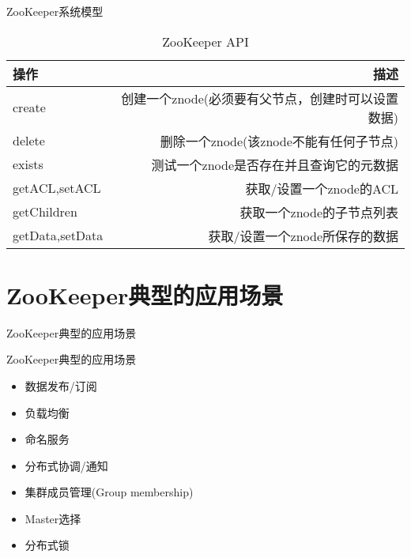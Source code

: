 \documentclass[10pt]{beamer}
\begin{document}
\begin{frame}[fragile]{ZooKeeper系统模型}

  \begin{table}
    \caption{ZooKeeper API}\center
    \begin{tabular}{lr}
      \toprule
      操作 & 描述\\
      \midrule
      create & 创建一个znode(必须要有父节点，创建时可以设置数据)\\
      delete & 删除一个znode(该znode不能有任何子节点)\\
      exists & 测试一个znode是否存在并且查询它的元数据\\
      getACL,setACL & 获取/设置一个znode的ACL\\
      getChildren & 获取一个znode的子节点列表\\
      getData,setData & 获取/设置一个znode所保存的数据\\
      \bottomrule
    \end{tabular}
  \end{table}
\end{frame}
\section{ZooKeeper典型的应用场景}

\begin{frame}[fragile]{ZooKeeper典型的应用场景}
  \begin{alertblock}{ZooKeeper典型的应用场景}
    \begin{itemize}
      \item 数据发布/订阅
      \item 负载均衡
      \item 命名服务
      \item 分布式协调/通知
      \item 集群成员管理(Group membership)
      \item Master选择
      \item 分布式锁
    \end{itemize}
  \end{alertblock}
\end{frame}
\end{document}
